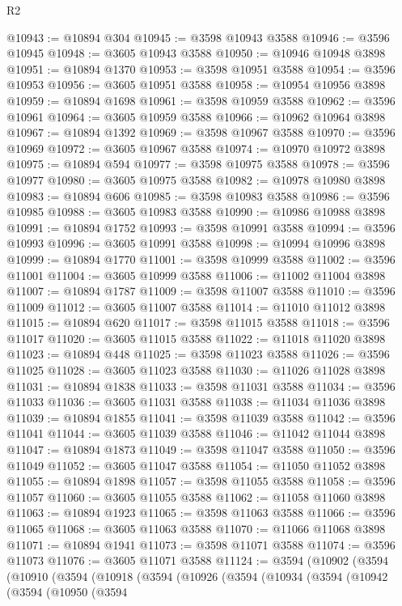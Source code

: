 \begin{lexlean}{R2}
\begin{coremodule}
@10943 := @10894 @304
@10945 := @3598 @10943 @3588
@10946 := @3596 @10945
@10948 := @3605 @10943 @3588
@10950 := @10946 @10948 @3898
@10951 := @10894 @1370
@10953 := @3598 @10951 @3588
@10954 := @3596 @10953
@10956 := @3605 @10951 @3588
@10958 := @10954 @10956 @3898
@10959 := @10894 @1698
@10961 := @3598 @10959 @3588
@10962 := @3596 @10961
@10964 := @3605 @10959 @3588
@10966 := @10962 @10964 @3898
@10967 := @10894 @1392
@10969 := @3598 @10967 @3588
@10970 := @3596 @10969
@10972 := @3605 @10967 @3588
@10974 := @10970 @10972 @3898
@10975 := @10894 @594
@10977 := @3598 @10975 @3588
@10978 := @3596 @10977
@10980 := @3605 @10975 @3588
@10982 := @10978 @10980 @3898
@10983 := @10894 @606
@10985 := @3598 @10983 @3588
@10986 := @3596 @10985
@10988 := @3605 @10983 @3588
@10990 := @10986 @10988 @3898
@10991 := @10894 @1752
@10993 := @3598 @10991 @3588
@10994 := @3596 @10993
@10996 := @3605 @10991 @3588
@10998 := @10994 @10996 @3898
@10999 := @10894 @1770
@11001 := @3598 @10999 @3588
@11002 := @3596 @11001
@11004 := @3605 @10999 @3588
@11006 := @11002 @11004 @3898
@11007 := @10894 @1787
@11009 := @3598 @11007 @3588
@11010 := @3596 @11009
@11012 := @3605 @11007 @3588
@11014 := @11010 @11012 @3898
@11015 := @10894 @620
@11017 := @3598 @11015 @3588
@11018 := @3596 @11017
@11020 := @3605 @11015 @3588
@11022 := @11018 @11020 @3898
@11023 := @10894 @448
@11025 := @3598 @11023 @3588
@11026 := @3596 @11025
@11028 := @3605 @11023 @3588
@11030 := @11026 @11028 @3898
@11031 := @10894 @1838
@11033 := @3598 @11031 @3588
@11034 := @3596 @11033
@11036 := @3605 @11031 @3588
@11038 := @11034 @11036 @3898
@11039 := @10894 @1855
@11041 := @3598 @11039 @3588
@11042 := @3596 @11041
@11044 := @3605 @11039 @3588
@11046 := @11042 @11044 @3898
@11047 := @10894 @1873
@11049 := @3598 @11047 @3588
@11050 := @3596 @11049
@11052 := @3605 @11047 @3588
@11054 := @11050 @11052 @3898
@11055 := @10894 @1898
@11057 := @3598 @11055 @3588
@11058 := @3596 @11057
@11060 := @3605 @11055 @3588
@11062 := @11058 @11060 @3898
@11063 := @10894 @1923
@11065 := @3598 @11063 @3588
@11066 := @3596 @11065
@11068 := @3605 @11063 @3588
@11070 := @11066 @11068 @3898
@11071 := @10894 @1941
@11073 := @3598 @11071 @3588
@11074 := @3596 @11073
@11076 := @3605 @11071 @3588
@11124 := @3594
    (@10902
      (@3594
        (@10910
          (@3594
            (@10918
              (@3594
                (@10926
                  (@3594
                    (@10934
                      (@3594
                        (@10942
                          (@3594
                            (@10950
                              (@3594

\end{coremodule}
\end{lexlean}
